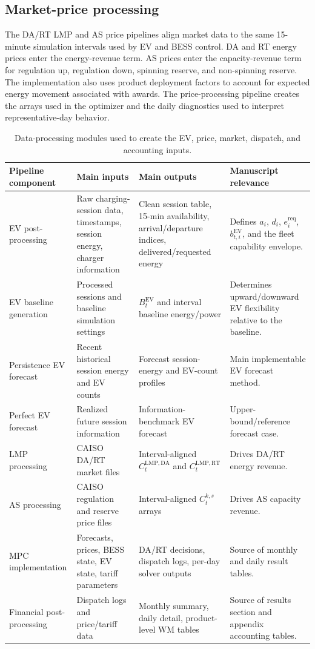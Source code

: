 \documentclass[final,5p,times]{elsarticle}
\newcommand{\EV}{\mathrm{EV}}
\newcommand{\DA}{\mathrm{DA}}
\newcommand{\RT}{\mathrm{RT}}
\newcommand{\req}{\mathrm{req}}
\begin{document}
\subsection{Market-price processing}
The DA/RT LMP and AS price pipelines align market data to the same 15-minute simulation intervals used by EV and BESS control. DA and RT energy prices enter the energy-revenue term. AS prices enter the capacity-revenue term for regulation up, regulation down, spinning reserve, and non-spinning reserve. The implementation also uses product deployment factors to account for expected energy movement associated with awards. The price-processing pipeline creates the arrays used in the optimizer and the daily diagnostics used to interpret representative-day behavior.

\begin{table}[!t]
\centering
\caption{Data-processing modules used to create the EV, price, market, dispatch, and accounting inputs.}
\label{tab:data_pipeline}
\scriptsize
\begin{tabularx}{\textwidth}{@{}p{}p{}p{}X@{}}
\toprule
Pipeline component & Main inputs & Main outputs & Manuscript relevance \\
\midrule
EV post-processing & Raw charging-session data, timestamps, session energy, charger information & Clean session table, 15-min availability, arrival/departure indices, delivered/requested energy & Defines $a_i$, $d_i$, $e_i^{\req}$, $b_{t,i}^{\EV}$, and the fleet capability envelope.\\
EV baseline generation & Processed sessions and baseline simulation settings & $B_t^{\EV}$ and interval baseline energy/power & Determines upward/downward EV flexibility relative to the baseline.\\
Persistence EV forecast & Recent historical session energy and EV counts & Forecast session-energy and EV-count profiles & Main implementable EV forecast method.\\
Perfect EV forecast & Realized future session information & Information-benchmark EV forecast & Upper-bound/reference forecast case.\\
LMP processing & CAISO DA/RT market files & Interval-aligned $C_t^{\mathrm{LMP},\DA}$ and $C_t^{\mathrm{LMP},\RT}$ & Drives DA/RT energy revenue.\\
AS processing & CAISO regulation and reserve price files & Interval-aligned $C_t^{k,s}$ arrays & Drives AS capacity revenue.\\
MPC implementation & Forecasts, prices, BESS state, EV state, tariff parameters & DA/RT decisions, dispatch logs, per-day solver outputs & Source of monthly and daily result tables.\\
Financial post-processing & Dispatch logs and price/tariff data & Monthly summary, daily detail, product-level WM tables & Source of results section and appendix accounting tables.\\
\bottomrule
\end{tabularx}
\end{table}
\end{document}
